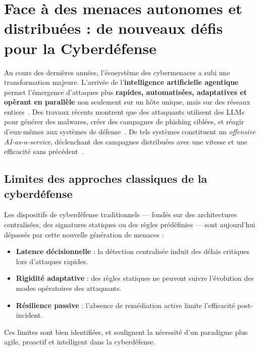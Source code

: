 \documentclass[ twoside,openright,titlepage,numbers=noenddot,headinclude,%
                footinclude=true,cleardoublepage=empty,abstractoff, %
                BCOR=5mm,paper=a4,fontsize=11pt,%
                french,american,%
                ]{scrreprt}
\begin{document}
\section{Face à des menaces autonomes et distribuées : de nouveaux défis pour la Cyberdéfense}\label{sec:evolution-menaces}


Au cours des dernières années, l'écosystème des cybermenaces a subi une transformation majeure. L'arrivée de l'\textbf{intelligence artificielle agentique} permet l'émergence d'attaques plus \textbf{rapides, automatisées, adaptatives et opèrant en parallèle} non seulement sur un hôte unique, mais sur des réseaux entiers~\cite{Cohen2020}. Des travaux récents montrent que des attaquants utilisent des LLMs pour générer des malwares, créer des campagnes de phishing ciblées, et réagir d'eux-mêmes aux systèmes de défense~\cite{AutoAttacker2024}. De tels systèmes constituent un {\em offensive AI-as-a-service}, déclenchant des campagnes distribuées avec une vitesse et une efficacité sans précédent~\cite{AgenticAIThreats2025}.

\subsection*{Limites des approches classiques de la cyberdéfense}

Les dispositifs de cyberdéfense traditionnels — fondés sur des architectures centralisées, des signatures statiques ou des règles prédéfinies — sont aujourd'hui dépassés par cette nouvelle génération de menaces :
\begin{itemize}
    \item \textbf{Latence décisionnelle} : la détection centralisée induit des délais critiques lors d'attaques rapides.
    \item \textbf{Rigidité adaptative} : des règles statiques ne peuvent suivre l'évolution des modes opératoires des attaquants.
    \item \textbf{Résilience passive} : l'absence de remédiation active limite l'efficacité post-incident.
\end{itemize}
Ces limites sont bien identifiées, et soulignent la nécessité d'un paradigme plus agile, proactif et intelligent dans la cyberdéfense.
\end{document}
